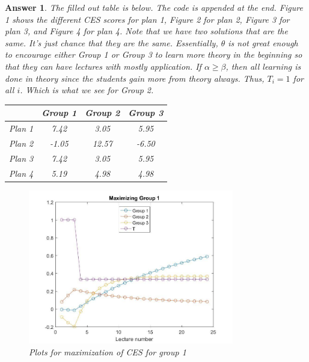 \documentclass[12pt]{article}
\theoremstyle{colon}
\newtheorem*{answer}{Answer}
\begin{document}
\begin{answer}
  The filled out table is below. The code is appended at the end. Figure 1 shows the different CES scores for plan 1, Figure 2 for plan 2, Figure 3 for plan 3, and Figure 4 for plan 4. Note that we have two solutions that are the same. It's just chance that they are the same. Essentially, $\theta$ is not great enough to encourage either Group 1 or Group 3 to learn more theory in the beginning so that they can have lectures with mostly application. If $\alpha \geq \beta$, then all learning is done in theory since the students gain more from theory always. Thus, $T_i = 1$ for all $i$. Which is what we see for Group 2.
  \begin{center}
    \begin{tabular}{|c|c|c|c|}
      \cline{2-4}
      \multicolumn{1}{c|}{}
      & Group 1 & Group 2 & Group 3 \\
      \hline
      Plan 1 & 7.42 & 3.05 & 5.95 \\
      \hline
      Plan 2 & -1.05 & 12.57 & -6.50 \\
      \hline
      Plan 3 & 7.42 & 3.05 & 5.95 \\
      \hline
      Plan 4 & 5.19 & 4.98 & 4.98 \\
      \hline
    \end{tabular}
  \end{center}

  \begin{figure}[ht]
    \caption{Plots for maximization of CES for group 1}
    \centering
      \includegraphics[width=0.8\textwidth]{group1.jpg}
  \end{figure}


\end{answer}
\end{document}
